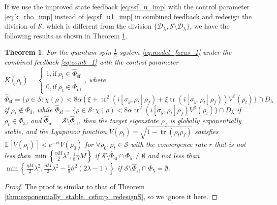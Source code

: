 \documentclass[]{elsarticle}
\newtheorem{thm}{Theorem}
\begin{document}
If we use the improved state feedback \eqref{eq:ssf_u_imp} with the control parameter \eqref{eq:k_rho_imp} instead of \eqref{eq:sf_u1_imp} in combined feedback and redesign the division of $\mathcal{S}$, which is different from the division $\{\mathcal{D}_\lambda, \mathcal{S}\setminus\mathcal{D}_\lambda\}$, we have the following results as shown in Theorem \ref{thm:exponentially_stable_csfimp_redesignS2}.
\begin{thm}\label{thm:exponentially_stable_csfimp_redesignS2}
	For the quantum spin-$\frac{1}{2}$ system \eqref{eq:model_focus_1} under the combined feedback \eqref{eq:comb_1} with the control parameter
	$K\left(\rho_t\right)=\left\{ \begin{array}{l}1, \text{if}~\rho_t\in \hat{\Phi}_{\mathrm{sf}}\\ 0, \text{if}~\rho_t\in \hat{\Phi}_{\mathrm{nf}}\end{array} \right.$, 
	where $\hat{\Phi}_{\mathrm{sf}}=\{\rho\in \mathcal{S}:\chi\left(\rho\right)<8\alpha\left(\xi+\operatorname{tr}^2\left(i\left[\sigma_{y}, \rho_{t}\right] \rho_f\right)+\xi\operatorname{tr}\left(i\left[\sigma_{y}, \rho_{t}\right] {\rho_f}\right)\right)V^{\beta}\left(\rho_{t}\right)\}\cap D_\lambda$ if 
	$\rho_t\notin\Phi_3$, while $\hat{\Phi}_{\mathrm{sf}}=\{\rho\in \mathcal{S}:\chi\left(\rho\right)<8\alpha\operatorname{tr}^2\left(i\left[\sigma_{y}, \rho_{t}\right] {\rho_f}\right)V^{\beta}\left(\rho_{t}\right)\}\cap D_\lambda$ if 
	$\rho_t\in\Phi_3$, and $\hat{\Phi}_{\mathrm{nf}}=\mathcal{S}\setminus\hat{\Phi}_{\mathrm{sf}}$, then the target eigenstate $\rho_f$ is globally exponentially stable, and the Lyapunov function $V(\rho_{t})=\sqrt{1-\operatorname{tr}\left(\rho_t\rho_f\right)}$ satisfies $\mathbb{E}\left[V\left(\rho_{t}\right)\right]<e^{-rt} V\left(\rho_{0}\right)$ for $\forall \rho_0,\rho_{t}\in \mathcal{S}$ with the convergence rate $r$ that is not less than $\min\left\{\frac{{\eta M}}{2}\lambda^{2}, \frac{1}{8}\eta M\right\}$ if $\mathcal{S}\setminus \hat{\Phi}_{\mathrm{sf}}\cap\Phi_5\neq\emptyset$ and not less than $\min\left\{\frac{{\eta M}}{2}\lambda^{2}, \frac{{\eta M}}{2}\lambda^{2}-\frac{1}{8}\vartheta^2\left(2\lambda-1\right)\right\}$ if $\mathcal{S}\setminus \hat{\Phi}_{\mathrm{sf}}\cap\Phi_5=\emptyset$. 
\end{thm}
\begin{proof}
	The proof is similar to that of Theorem \ref{thm:exponentially_stable_csfimp_redesignS}, so we ignore it here.
\end{proof}
\end{document}
